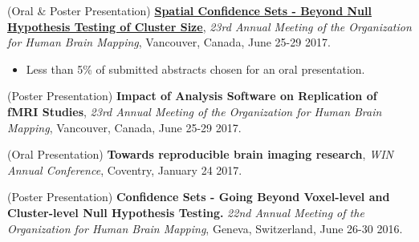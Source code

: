 \documentclass[a4paper,10pt]{article}
\begin{document}
(Oral \& Poster Presentation) \textbf{\href{https://www.pathlms.com/ohbm/courses/5158/sections/7816/video_presentations/78445}{Spatial Confidence Sets - Beyond Null Hypothesis Testing of Cluster Size}}, \textit{23rd Annual Meeting of the Organization for Human Brain Mapping}, Vancouver, Canada, June 25-29 2017.
\vspace{-2mm}
\begin{itemize}
\item Less than 5\% of submitted abstracts chosen for an oral presentation. 
\end{itemize}

(Poster Presentation) \textbf{Impact of Analysis Software on Replication of fMRI Studies}, \textit{23rd Annual Meeting of the Organization for Human Brain Mapping}, Vancouver, Canada, June 25-29 2017.

(Oral Presentation) \textbf{Towards reproducible brain imaging research}, \textit{WIN Annual Conference}, Coventry, January 24 2017.

(Poster Presentation) \textbf{Confidence Sets - Going Beyond Voxel-level and Cluster-level Null Hypothesis Testing.} \textit{22nd Annual Meeting of the Organization for Human Brain Mapping}, Geneva, Switzerland, June 26-30 2016. 

\end{document}
